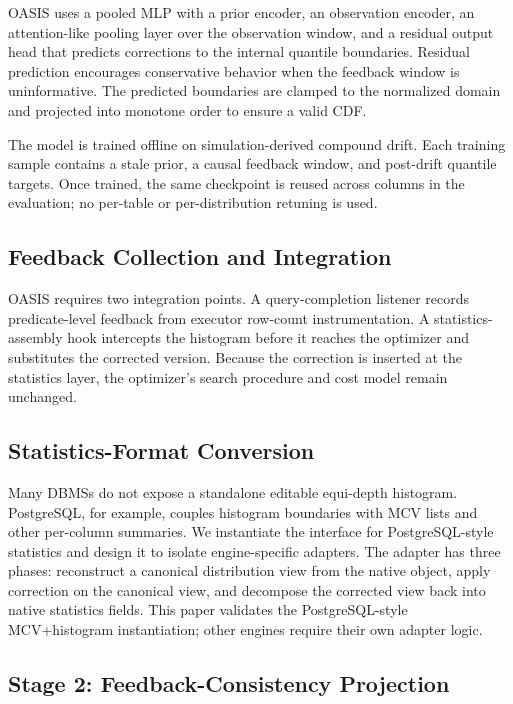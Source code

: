\documentclass[preprint,12pt]{elsarticle}
\begin{document}
OASIS uses a pooled MLP with a prior encoder, an observation encoder, an
attention-like pooling layer over the observation window, and a residual output
head that predicts corrections to the internal quantile boundaries. Residual
prediction encourages conservative behavior when the feedback window is
uninformative. The predicted boundaries are clamped to the normalized domain
and projected into monotone order to ensure a valid CDF.

The model is trained offline on simulation-derived compound drift. Each
training sample contains a stale prior, a causal feedback window, and
post-drift quantile targets. Once trained, the same checkpoint is reused across
columns in the evaluation; no per-table or per-distribution retuning is used.

\subsection{Feedback Collection and Integration}
\label{sec:integration}

OASIS requires two integration points. A query-completion listener records
predicate-level feedback from executor row-count instrumentation. A
statistics-assembly hook intercepts the histogram before it reaches the
optimizer and substitutes the corrected version. Because the correction is
inserted at the statistics layer, the optimizer's search procedure and cost
model remain unchanged.

\subsection{Statistics-Format Conversion}
\label{sec:mcv-adapter}

Many DBMSs do not expose a standalone editable equi-depth histogram.
PostgreSQL, for example, couples histogram boundaries with MCV lists and other
per-column summaries. We instantiate the interface for PostgreSQL-style
statistics and design it to isolate engine-specific adapters. The adapter has
three phases: reconstruct a canonical distribution view from the native object,
apply correction on the canonical view, and decompose the corrected view back
into native statistics fields. This paper validates the PostgreSQL-style
MCV+histogram instantiation; other engines require their own adapter logic.

\subsection{Stage 2: Feedback-Consistency Projection}
\label{sec:oasis-proj}
\end{document}
